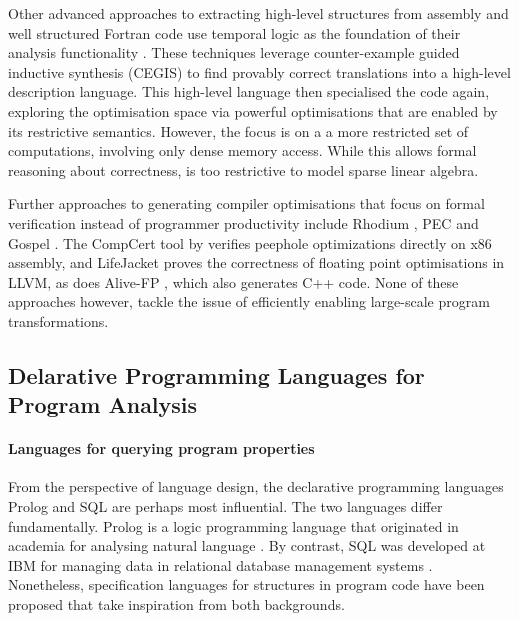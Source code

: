     Other advanced approaches to extracting high-level structures from assembly
    and well structured Fortran code use temporal logic as the foundation of
    their analysis functionality \cite{Mendis2015Helium, Kamil2016Verified}.
    These techniques leverage counter-example guided inductive synthesis (CEGIS)
    to find provably correct translations into a high-level description
    language.
    This high-level language then specialised the code again, exploring the
    optimisation space via powerful optimisations that are enabled by its
    restrictive semantics.
    However, the focus is on a a more restricted set of computations, involving
    only dense memory access.
    While this allows formal reasoning about correctness, is too restrictive to
    model sparse linear algebra.

    Further approaches to generating compiler optimisations that focus on formal
    verification instead of programmer productivity include Rhodium
    \citep{Lerner:2005:ASP:1040305.1040335}, PEC
    \citep{Kundu:2009:POC:1543135.1542513} and Gospel
    \citep{Whitfield:1997:AEC:267959.267960}.
    The CompCert tool by \citet{Mullen:2016:VPO:2908080.2908109} verifies
    peephole optimizations directly on x86 assembly, and LifeJacket
    \citep{Notzli:2016:LVP:2931021.2931024} proves the correctness of floating
    point optimisations in LLVM, as does Alive-FP \citep{Menendez2016}, which
    also generates C++ code.
    None of these approaches however, tackle the issue of efficiently enabling
    large-scale program transformations.

\subsection{Delarative Programming Languages for Program Analysis}

    \paragraph*{Languages for querying program properties}
    From the perspective of language design, the declarative programming
    languages Prolog and SQL are perhaps most influential.
    The two languages differ fundamentally.
    Prolog is a logic programming language that originated in academia for
    analysing natural language \citep{Colmerauer:1993:BP:154766.155362}.
    By contrast, SQL was developed at IBM for managing data in
    relational database management systems
    \citep{Chamberlin:1974:SSE:800296.811515}.
    Nonetheless, specification languages for structures in program code have
    been proposed that take inspiration from both backgrounds.

